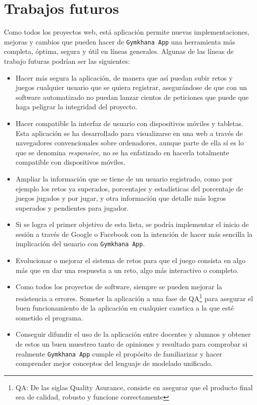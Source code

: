\documentclass[a4paper, 12pt]{book}
\begin{document}
\section{Trabajos futuros}
\label{sec:trabajos_futuros}
Como todos los proyectos web, está aplicación permite nuevas implementaciones, mejoras y cambios que pueden hacer de \texttt{Gymkhana App} una herramienta más completa, óptima, segura y útil en líneas generales. Algunas de las líneas de trabajo futuras podrían ser las siguientes: 

\begin{itemize}
	\item Hacer más segura la aplicación, de manera que así puedan subir retos y juegos cualquier usuario que se quiera registrar, asegurándose de que con un software automatizado no puedan lanzar cientos de peticiones que puede que haga peligrar la integridad del proyecto.
	\item Hacer compatible la interfaz de usuario con dispositivos móviles y tabletas. Esta aplicación se ha desarrollado para visualizarse en una web a través de navegadores convencionales sobre ordenadores, aunque parte de ella sí es lo que se denomina \emph{responsive}, no se ha enfatizado en hacerla totalmente compatible con dispositivos móviles. 
	\item Ampliar la información que se tiene de un usuario registrado, como por ejemplo los retos ya superados, porcentajes y estadísticas del porcentaje de juegos jugados y por jugar, y otra información que detalle más logros superados y pendientes para jugador. 
	\item Si se logra el primer objetivo de esta lista, se podría implementar el inicio de sesión a través de Google o Facebook con la intención de hacer más sencilla la implicación del usuario con \texttt{Gymkhana App}. 
	\item Evolucionar o mejorar el sistema de retos para que el juego consista en algo más que en dar una respuesta a un reto, algo más interactivo o completo. 
	\item Como todos los proyectos de software, siempre se pueden mejorar la resistencia a errores. Someter la aplicación a una fase de QA\footnote{QA: De las siglas Quality Asurance, consiste en asegurar que el producto final sea de calidad, robusto y funcione correctamente} para asegurar el buen funcionamiento de la aplicación en cualquier caustica a la que esté sometido el programa.
	\item Conseguir difundir el uso de la aplicación entre docentes y alumnos y obtener de estos un buen muestreo tanto de opiniones y resultado para comprobar si realmente \texttt{Gymkhana App} cumple el propósito de familiarizar y hacer comprender mejor conceptos del lenguaje de modelado unificado. 
	
\end{itemize}
\end{document}
